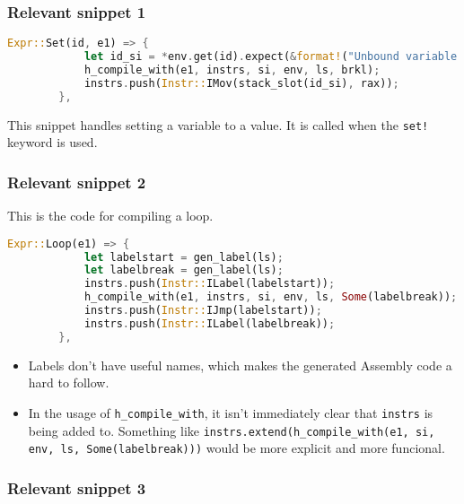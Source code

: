 	\subsubsection{Relevant snippet 1}

	\begin{lstlisting}[language=Rust]
		Expr::Set(id, e1) => {
		    let id_si = *env.get(id).expect(&format!("Unbound variable identifier {}", id));
		    h_compile_with(e1, instrs, si, env, ls, brkl);
		    instrs.push(Instr::IMov(stack_slot(id_si), rax));
		},
	\end{lstlisting}

	This snippet handles setting a variable to a value. It is called when the \verb|set!| keyword is used.

	\subsubsection{Relevant snippet 2}

	This is the code for compiling a loop.
	\begin{lstlisting}[language=Rust]
		Expr::Loop(e1) => {
		    let labelstart = gen_label(ls);
		    let labelbreak = gen_label(ls);
		    instrs.push(Instr::ILabel(labelstart));
		    h_compile_with(e1, instrs, si, env, ls, Some(labelbreak));
		    instrs.push(Instr::IJmp(labelstart));
		    instrs.push(Instr::ILabel(labelbreak));
		},
	\end{lstlisting}

	\begin{itemize}
		\item Labels don't have useful names, which makes the generated Assembly code a hard to follow.
		\item In the usage of \verb|h_compile_with|, it isn't immediately clear that \verb|instrs| is being added to. 
			Something like \verb|instrs.extend(h_compile_with(e1, si, env, ls, Some(labelbreak)))| would be more explicit and more funcional.
	\end{itemize}

	\subsubsection{Relevant snippet 3}
	
